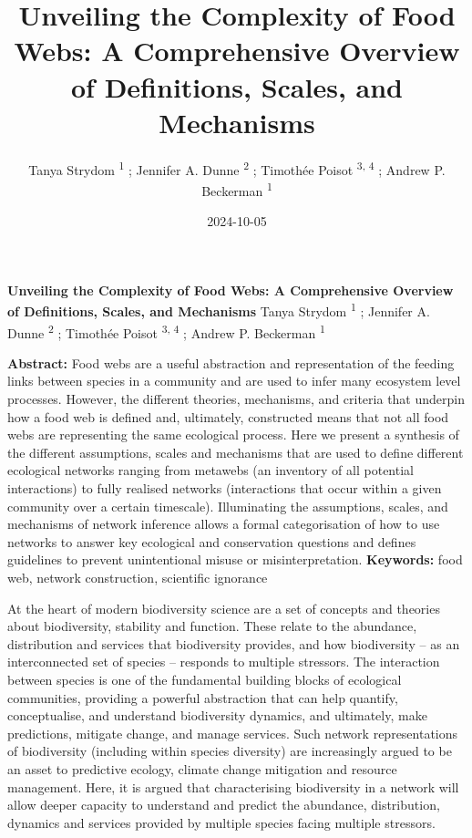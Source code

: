 \documentclass[
]{article}
\title{Unveiling the Complexity of Food Webs: A Comprehensive Overview
of Definitions, Scales, and Mechanisms}
\author{Tanya Strydom %
%
\textsuperscript{%
%
1%
}%
; Jennifer A. Dunne %
%
\textsuperscript{%
%
2%
}%
; Timothée Poisot %
%
\textsuperscript{%
3,%
4%
}%
; Andrew P. Beckerman %
%
\textsuperscript{%
%
1%
}%
}
\date{2024-10-05}
\begin{document}
\thispagestyle{empty}
{\bfseries\sffamily\Large Unveiling the Complexity of Food Webs: A
Comprehensive Overview of Definitions, Scales, and Mechanisms}
\vfil
Tanya Strydom %
%
\textsuperscript{%
%
1%
}%
; Jennifer A. Dunne %
%
\textsuperscript{%
%
2%
}%
; Timothée Poisot %
%
\textsuperscript{%
3,%
4%
}%
; Andrew P. Beckerman %
%
\textsuperscript{%
%
1%
}%

\vfil
{\small
\textbf{Abstract:} Food webs are a useful abstraction and representation
of the feeding links between species in a community and are used to
infer many ecosystem level processes. However, the different theories,
mechanisms, and criteria that underpin how a food web is defined and,
ultimately, constructed means that not all food webs are representing
the same ecological process. Here we present a synthesis of the
different assumptions, scales and mechanisms that are used to define
different ecological networks ranging from metawebs (an inventory of all
potential interactions) to fully realised networks (interactions that
occur within a given community over a certain timescale). Illuminating
the assumptions, scales, and mechanisms of network inference allows a
formal categorisation of how to use networks to answer key ecological
and conservation questions and defines guidelines to prevent
unintentional misuse or misinterpretation.
\vfil
\textbf{Keywords:} %
food web, network construction, %
scientific ignorance%
}
\clearpage
\setcounter{page}{1}
\doublespacing
\linenumbers

At the heart of modern biodiversity science are a set of concepts and
theories about biodiversity, stability and function. These relate to the
abundance, distribution and services that biodiversity provides, and how
biodiversity -- as an interconnected set of species -- responds to
multiple stressors. The interaction between species is one of the
fundamental building blocks of ecological communities, providing a
powerful abstraction that can help quantify, conceptualise, and
understand biodiversity dynamics, and ultimately, make predictions,
mitigate change, and manage services. Such network representations of
biodiversity (including within species diversity) are increasingly
argued to be an asset to predictive ecology, climate change mitigation
and resource management. Here, it is argued that characterising
biodiversity in a network will allow deeper capacity to understand and
predict the abundance, distribution, dynamics and services provided by
multiple species facing multiple stressors.
\end{document}
